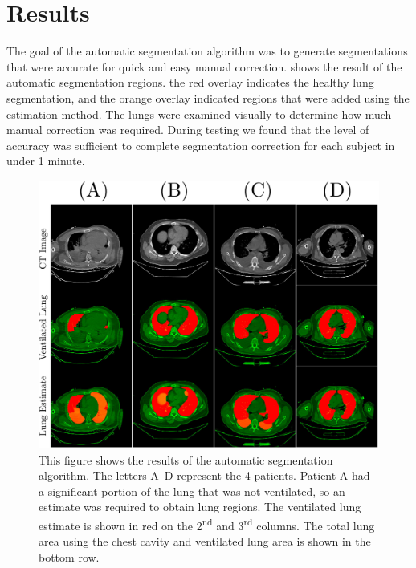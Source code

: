 \section{Results}

The goal of the automatic segmentation algorithm was to 
generate segmentations that were accurate for quick 
and easy manual correction. 
shows the result of the automatic segmentation regions.
the red overlay indicates the healthy lung segmentation,
and the orange overlay indicated regions that were added
using the estimation method. 
The lungs were examined visually to determine 
how much manual correction was required. During testing
we found that the level of accuracy was sufficient to 
complete segmentation correction for each subject in 
under 1 minute.

\begin{figure}
	\centering
	\includegraphics[width=\textwidth]{chapter5-CT_to_mesh/imgs/lung_segmentation_results.pdf}
	\caption[Lung segmentation results]{\label{fig:lung-seg-results}%
	This figure shows the results of the automatic segmentation algorithm. The letters A--D 
	represent the 4 patients. Patient A had a significant portion of the lung that was not
	ventilated, so an estimate was required to obtain lung regions. The ventilated lung estimate
	is shown in red on the 2\textsuperscript{nd} and 3\textsuperscript{rd} columns.
	The total lung area using the chest cavity and ventilated lung area is shown in the
	bottom row.}
\end{figure}

